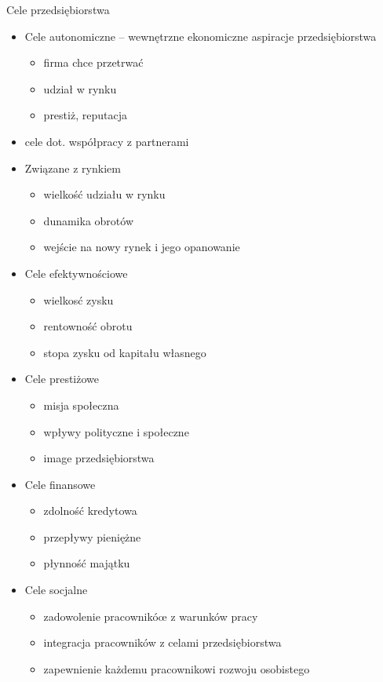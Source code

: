 \documentclass[a4paper,10pt]{report}
\begin{document}
\noindent Cele przedsiębiorstwa
\begin{itemize}
	\item Cele autonomiczne -- wewnętrzne ekonomiczne aspiracje przedsiębiorstwa
	\begin{itemize}
		\item firma chce przetrwać
		\item udział w rynku
		\item prestiż, reputacja
	\end{itemize}
	\item cele dot. współpracy z partnerami
\end{itemize}


\begin{itemize}

	\item Związane z rynkiem
	\begin{itemize}
		\item wielkość udziału w rynku
		\item dunamika obrotów
		\item wejście na nowy rynek i jego opanowanie
	\end{itemize}

	\item Cele efektywnościowe
	\begin{itemize}
		\item wielkosć zysku
		\item rentowność obrotu
		\item stopa zysku od kapitału własnego
	\end{itemize}

	\item Cele prestiżowe
	\begin{itemize}
		\item misja społeczna
		\item wpływy polityczne i społeczne
		\item image przedsiębiorstwa
	\end{itemize}

	\item Cele finansowe
	\begin{itemize}
		\item zdolność kredytowa
		\item przepływy pieniężne
		\item płynność majątku
	\end{itemize}

	\item Cele socjalne
	\begin{itemize}
		\item zadowolenie pracownikóœ z warunków pracy
		\item integracja pracowników z celami przedsiębiorstwa
		\item zapewnienie każdemu pracownikowi rozwoju osobistego
	\end{itemize}
	
\end{itemize}
\end{document}
